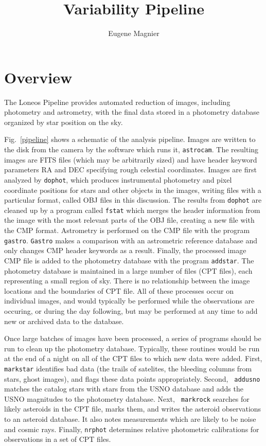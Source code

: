 \documentclass{article}
\title{Variability Pipeline}
\author{Eugene Magnier}
\begin{document}
\maketitle

\section{Overview}

The Loneos Pipeline provides automated reduction of images, including
photometry and astrometry, with the final data stored in a photometry
database organized by star position on the sky.

Fig.~\ref{pipeline} shows a schematic of the analysis pipeline.
Images are written to the disk from the camera by the software which
runs it, {\tt astrocam}.  The resulting images are FITS files (which
may be arbitrarily sized) and have header keyword parameters RA and
DEC specifying rough celestial coordinates.  Images are first analyzed
by {\tt dophot}, which produces instrumental photometry and pixel
coordinate positions for stars and other objects in the images,
writing files with a particular format, called OBJ files in this
discussion.  The results from {\tt dophot} are cleaned up by a program
called {\tt fstat} which merges the header information from the image
with the most relevant parts of the OBJ file, creating a new file with
the CMP format.  Astrometry is performed on the CMP file with the
program {\tt gastro}.  {\tt Gastro} makes a comparison with an
astrometric reference database and only changes CMP header keywords as
a result.  Finally, the processed image CMP file is added to the
photometry database with the program {\tt addstar}.  The photometry
database is maintained in a large number of files (CPT files), each
representing a small region of sky.  There is no relationship between
the image locations and the boundaries of CPT file.  All of these
processes occur on individual images, and would typically be performed
while the observations are occuring, or during the day following, but
may be performed at any time to add new or archived data to the
database.

Once large batches of images have been processed, a series of programs
should be run to clean up the photometry database.  Typically, these
routines would be run at the end of a night on all of the CPT files to
which new data were added.  First, {\tt markstar} identifies bad data
(the trails of satelites, the bleeding columns from stars, ghost
images), and flags these data points appropriately.  Second, {\tt
  addusno} matches the catalog stars with stars from the USNO database
and adds the USNO magnitudes to the photometry database.  Next, {\tt
  markrock} searches for likely asteroids in the CPT file, marks them,
and writes the asteroid observations to an asteroid database.  It also
notes measurements which are likely to be noise and cosmic rays.
Finally, {\tt nrphot} determines relative photometric calibrations for
observations in a set of CPT files.  
\end{document}
